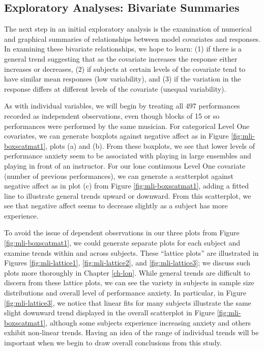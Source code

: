 \documentclass[
]{krantz}
\begin{document}
\subsection{Exploratory Analyses: Bivariate Summaries}\label{explore2}

The next step in an initial exploratory analysis is the examination of numerical and graphical summaries of relationships between model covariates and responses. In examining these bivariate relationships, we hope to learn: (1) if there is a general trend suggesting that as the covariate increases the response either increases or decreases, (2) if subjects at certain levels of the covariate tend to have similar mean responses (low variability), and (3) if the variation in the response differs at different levels of the covariate (unequal variability).

As with individual variables, we will begin by treating all 497 performances recorded as independent observations, even though blocks of 15 or so performances were performed by the same musician. For categorical Level One covariates, we can generate boxplots against negative affect as in Figure \ref{fig:mli-boxscatmat1}, plots (a) and (b). From these boxplots, we see that lower levels of performance anxiety seem to be associated with playing in large ensembles and playing in front of an instructor. For our lone continuous Level One covariate (number of previous performances), we can generate a scatterplot against negative affect as in plot (c) from Figure \ref{fig:mli-boxscatmat1}, adding a fitted line to illustrate general trends upward or downward. From this scatterplot, we see that negative affect seems to decrease slightly as a subject has more experience.

To avoid the issue of dependent observations in our three plots from Figure \ref{fig:mli-boxscatmat1}, we could generate separate plots for each subject and examine trends within and across subjects. These ``lattice plots''  are illustrated in Figures \ref{fig:mli-lattice1}, \ref{fig:mli-lattice2}, and \ref{fig:mli-lattice3}; we discuss such plots more thoroughly in Chapter \ref{ch-lon}. While general trends are difficult to discern from these lattice plots, we can see the variety in subjects in sample size distributions and overall level of performance anxiety. In particular, in Figure \ref{fig:mli-lattice3}, we notice that linear fits for many subjects illustrate the same slight downward trend displayed in the overall scatterplot in Figure \ref{fig:mli-boxscatmat1}, although some subjects experience increasing anxiety and others exhibit non-linear trends. Having an idea of the range of individual trends will be important when we begin to draw overall conclusions from this study.
\end{document}
